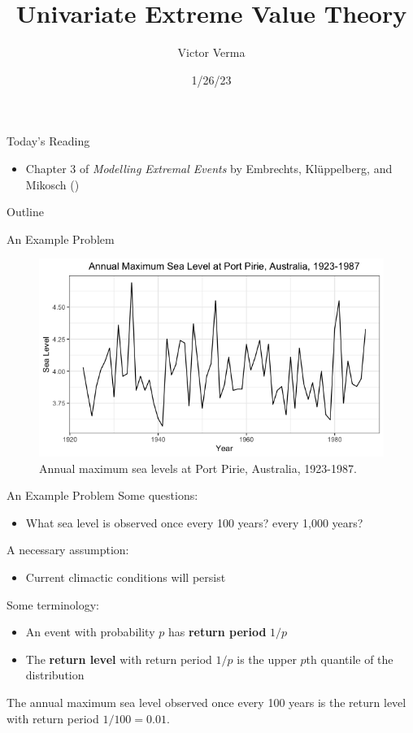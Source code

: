\documentclass{beamer}
\title[Univariate Extreme Value Theory]{Univariate Extreme Value Theory}
\author{Victor Verma}
\institute[]
{
Prof. Yang Chen's Reading Group \\
Department of Statistics \\
University of Michigan
}
\date[1/26/23]{1/26/23}
\begin{document}
\begin{frame}
    \titlepage
\end{frame}

\begin{frame}{Today's Reading}
    \begin{itemize}
        \item Chapter 3 of \textit{Modelling Extremal Events} by Embrechts, Kl\"{u}ppelberg, and Mikosch (\cite{embrechts_et_al_1997})
    \end{itemize}
\end{frame}

\begin{frame}{Outline}
    \tableofcontents
\end{frame}

\begin{frame}{An Example Problem}
    \begin{figure}
        \centering
        \includegraphics[scale=0.5]{max_sea_levels.png}
        \caption{Annual maximum sea levels at Port Pirie, Australia, 1923-1987.}
        \label{fig:max_sea_levels}
    \end{figure}    
\end{frame}

\begin{frame}{An Example Problem}
    Some questions:
    \begin{itemize}
        \item What sea level is observed once every 100 years? every 1,000 years?
    \end{itemize}

    A necessary assumption:
    \begin{itemize}
        \item Current climactic conditions will persist
    \end{itemize}

    \bigskip
    
    Some terminology:
    \begin{itemize}
        \item An event with probability $p$ has \textbf{return period} $1 / p$
        \item The \textbf{return level} with return period $1 / p$ is the upper $p$th quantile of the distribution
    \end{itemize}
    The annual maximum sea level observed once every 100 years is the return level with return period $1 / 100 = 0.01$.
\end{frame}
\end{document}
